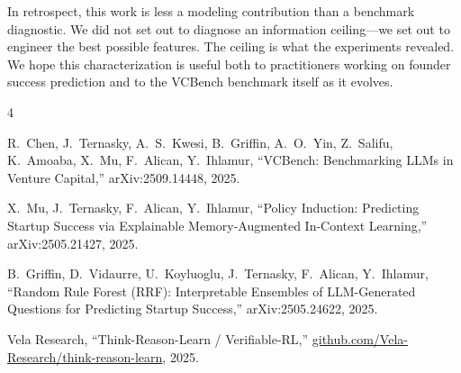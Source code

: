 \documentclass[10pt, conference]{IEEEtran}
\begin{document}
In retrospect, this work is less a modeling contribution than a benchmark diagnostic. We did not set out to diagnose an information ceiling---we set out to engineer the best possible features. The ceiling is what the experiments revealed. We hope this characterization is useful both to practitioners working on founder success prediction and to the VCBench benchmark itself as it evolves.

\begin{thebibliography}{4}

R.~Chen, J.~Ternasky, A.~S.~Kwesi, B.~Griffin, A.~O.~Yin, Z.~Salifu, K.~Amoaba, X.~Mu, F.~Alican, Y.~Ihlamur,
``VCBench: Benchmarking LLMs in Venture Capital,''
arXiv:2509.14448, 2025.

X.~Mu, J.~Ternasky, F.~Alican, Y.~Ihlamur,
``Policy Induction: Predicting Startup Success via Explainable Memory-Augmented In-Context Learning,''
arXiv:2505.21427, 2025.

B.~Griffin, D.~Vidaurre, U.~Koyluoglu, J.~Ternasky, F.~Alican, Y.~Ihlamur,
``Random Rule Forest (RRF): Interpretable Ensembles of LLM-Generated Questions for Predicting Startup Success,''
arXiv:2505.24622, 2025.

Vela Research,
``Think-Reason-Learn / Verifiable-RL,''
\url{github.com/Vela-Research/think-reason-learn}, 2025.

\end{thebibliography}
\end{document}
